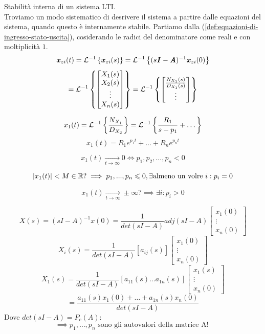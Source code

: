 \documentclass[12pt]{article}
\begin{document}
Stabilit\`a interna di un sistema LTI. \\
Troviamo un modo sistematico di desrivere il sistema a partire dalle equazioni del sistema, quando questo \`e internamente stabile. Partiamo dalla (\ref{def:equazioni-di-ingresso-stato-uscita}), cosiderando le radici del denominatore come reali e con moltiplicit\`a $1$.
\[ \textbf{\textit{x}} _{zi}(t) = \mathcal{L}^{-1} \left\{ \textbf{\textit{x}} _{zi}(s) \right\} = \mathcal{L}^{-1} \left\{ (s\textbf{\textit{I}}-\textbf{\textit{A}})^{-1}\textbf{\textit{x}} _{zi}(0) \right\} \]
\[ = \mathcal{L}^{-1} \left\{ \begin{bmatrix} X_1(s) \\ X_2(s) \\ \vdots \\ X_n(s) \end{bmatrix} \right\} = 
\mathcal{L}^{-1} \left\{ \begin{bmatrix} \frac{N _{X_1}(s)}{D _{X_1}(s)} \\ \vdots \end{bmatrix}  \right\} \]

\[ x_1(t) = \mathcal{L}^{-1} \left\{ \frac{N _{X_1}}{D _{X_2}}  \right\} = \mathcal{L}^{-1} \left\{ \frac{R_1}{s-p_1} + \dots \right\}  \]
\[ x_1(t) = R_1e^{p_1t} + \dots + R_ne^{p_nt} \]

\[ \boxed{ x_1(t) \underset{t \to \infty}{\longrightarrow} 0 \iff p_1,p_2,\dots,p_n < 0} \]

\[ \left| x_1(t) \right| < M \in \mathbb{R}? \implies p_1,...,p_n \leqslant 0, \exists \text{almeno un volre } i :p_i = 0 \]

\[ x_1(t) \underset{t \to \infty}{\longrightarrow} \pm \infty ? \implies \exists i: p_i > 0 \]

\[ X(s) = (sI-A)^{-1}x(0) = \frac{1}{det(sI-A)} adj(sI-A) \begin{bmatrix} x_1(0) \\ \vdots \\ x_n(0) \end{bmatrix}  \]
\[ X_i(s) = \frac{1}{det(sI-A)} \left[ a _{ij}(s) \right] \begin{bmatrix} x_1(0) \\ \vdots \\ x_n(0) \end{bmatrix}  \]
\[ X_1(s) = \frac{1}{det(sI-A)} \left[ a _{11}(s) \dots a _{1n}(s) \right] \begin{bmatrix} x_1(s) \\ \vdots \\ x_n(0) \end{bmatrix}  \]
\[ = \frac{a _{11}(s)x_1(0) +\dots + a _{1n}(s)x_n(0) }{det(sI-A)}  \]
Dove $det(sI-A) = P_c(A)$:
\[ \boxed{ \implies p_1,\dots,p_n \text{ sono gli autovalori della matrice A! }} \]
\end{document}
